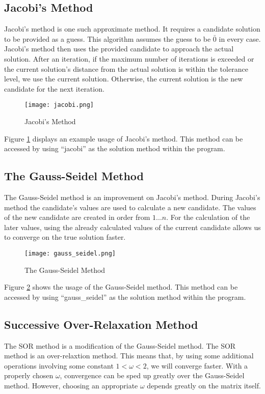 \documentclass[12pt]{article}
\begin{document}
\subsection{Jacobi's Method}
Jacobi's method is one such approximate method. It requires a candidate solution
to be provided as a guess. This algorithm assumes the guess to be $\bar{0}$ in 
every case. Jacobi's method then uses the provided candidate to approach the 
actual solution. After an iteration, if the maximum number of iterations is exceeded
or the current solution's distance from the actual solution is within the tolerance 
level, we use the current solution. Otherwise, the current solution is the new 
candidate for the next iteration. 
\begin{figure}[H]
\texttt{[image: jacobi.png]}
\caption{Jacobi's Method}
\label{jacobi}
\end{figure}

Figure \ref{jacobi} displays an example usage of Jacobi's method. This method can be accessed by using ``jacobi''
as the solution method within the program.


\subsection{The Gauss-Seidel Method}
The Gauss-Seidel method is an improvement on Jacobi's method. During Jacobi's method
the candidate's values are used to calculate a new candidate. The values of the
new candidate are created in order from $1...n$. For the calculation of the later
values, using the already calculated values of the current candidate allows us 
to converge on the true solution faster.

 
\begin{figure}[H]
\texttt{[image: gauss\_seidel.png]}
\caption{The Gauss-Seidel Method}
\label{gauss_seidel}
\end{figure}

Figure \ref{gauss_seidel} shows the usage of the Gauss-Seidel method. This method can be accessed by using ``gauss\_seidel''
as the solution method within the program.

\subsection{Successive Over-Relaxation Method}

The SOR method is a modification of the Gauss-Seidel method. The SOR method is 
an over-relaxtion method. This means that, by using some additional operations 
involving some constant $1 < \omega < 2$, we will converge faster. With a 
properly chosen $\omega$, convergence can be sped up greatly over the Gauss-Seidel
method. However, choosing an appropriate $\omega$ depends greatly on the matrix
itself. 
\end{document}
